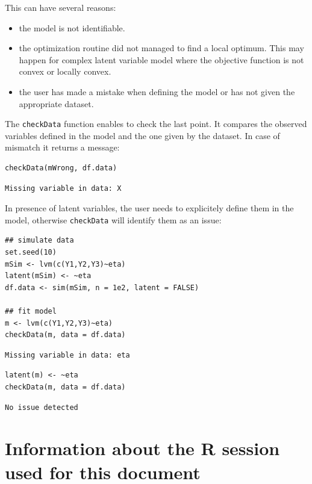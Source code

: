 \documentclass[12pt]{article}
\begin{document}
This can have several reasons:
\begin{itemize}
\item the model is not identifiable.
\item the optimization routine did not managed to find a local
optimum. This may happen for complex latent variable model where the
objective function is not convex or locally convex.
\item the user has made a mistake when defining the model or has not given
the appropriate dataset.
\end{itemize}

The \texttt{checkData} function enables to check the last point. It compares
the observed variables defined in the model and the one given by the
dataset. In case of mismatch it returns a message:
\lstset{language=r,label= ,caption= ,captionpos=b,numbers=none}
\begin{lstlisting}
checkData(mWrong, df.data)
\end{lstlisting}

\begin{verbatim}
Missing variable in data: X
\end{verbatim}


In presence of latent variables, the user needs to explicitely define
them in the model, otherwise \texttt{checkData} will identify them as an
issue:
\lstset{language=r,label= ,caption= ,captionpos=b,numbers=none}
\begin{lstlisting}
## simulate data
set.seed(10)
mSim <- lvm(c(Y1,Y2,Y3)~eta)
latent(mSim) <- ~eta
df.data <- sim(mSim, n = 1e2, latent = FALSE)

## fit model
m <- lvm(c(Y1,Y2,Y3)~eta)
checkData(m, data = df.data)
\end{lstlisting}

\begin{verbatim}
Missing variable in data: eta
\end{verbatim}


\lstset{language=r,label= ,caption= ,captionpos=b,numbers=none}
\begin{lstlisting}
latent(m) <- ~eta
checkData(m, data = df.data)
\end{lstlisting}

\begin{verbatim}
No issue detected
\end{verbatim}



\clearpage

\section{Information about the R session used for this document}
\label{sec:org95dd3ad}
\end{document}
